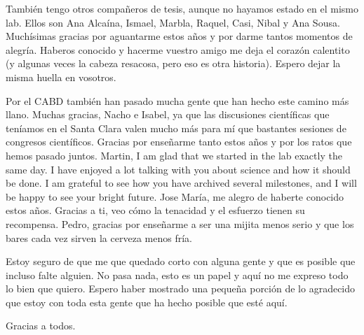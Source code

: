 \documentclass[
11pt, %
english, %
singlespacing, %
headsepline, %
chapterinoneline, %
]{MastersDoctoralThesis} %
\begin{document}
\begin{acknowledgements}
También tengo otros compañeros de tesis, aunque no hayamos estado en el mismo lab. Ellos son Ana Alcaína, Ismael, Marbla, Raquel, Casi, Nibal y Ana Sousa. Muchísimas gracias por aguantarme estos años y por darme tantos momentos de alegría. Haberos conocido y hacerme vuestro amigo me deja el corazón calentito (y algunas veces la cabeza resacosa, pero eso es otra historia). Espero dejar la misma huella en vosotros. 

Por el CABD también han pasado mucha gente que han hecho este camino más llano. Muchas gracias, Nacho e Isabel, ya que las discusiones científicas que teníamos en el Santa Clara valen mucho más para mí que bastantes sesiones de congresos científicos. Gracias por enseñarme tanto estos años y por los ratos que hemos pasado juntos. Martin, I am glad that we started in the lab exactly the same day. I have enjoyed a lot talking with you about science and how it should be done. I am grateful to see how you have archived several milestones, and I will be happy to see your bright future. Jose María, me alegro de haberte conocido estos años. Gracias a ti, veo cómo la tenacidad y el esfuerzo tienen su recompensa. Pedro, gracias por enseñarme a ser una mijita menos serio y que los bares cada vez sirven la cerveza menos fría. 

Estoy seguro de que me que quedado corto con alguna gente y que es posible que incluso falte alguien. No pasa nada, esto es un papel y aquí no me expreso todo lo bien que quiero. Espero haber mostrado una pequeña porción de lo agradecido que estoy con toda esta gente que ha hecho posible que esté aquí. 

Gracias a todos. 

\end{acknowledgements}


\tableofcontents %

\listoffigures %


\end{document}

